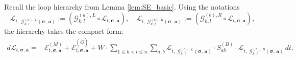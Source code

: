 \documentclass[10pt,reqno]{article}
\theoremstyle{plain} %
\theoremstyle{remark}
\numberwithin{equation}{section}
\begin{document}
 Recall the loop hierarchy from Lemma \ref{lem:SE_basic}. Using the notations
$$
\mathcal{L}_{t,\;  \mathcal{G}^{(a), \,L}_{k, \,l}\left(\boldsymbol{\sigma},\, \textbf{a}\right)} := \left( \mathcal{G}^{(a), L}_{k, l} \circ \mathcal{L}_{t, \boldsymbol{\sigma}, \textbf{a}} \right), \quad  
\mathcal{L}_{t,\;  \mathcal{G}^{(b), \,R}_{k, \,l}\left(\boldsymbol{\sigma},\, \textbf{a}\right)} := \left( \mathcal{G}^{(b), R}_{k, l} \circ \mathcal{L}_{t, \boldsymbol{\sigma}, \textbf{a}} \right),
$$
the hierarchy takes the compact form:
\begin{align}
    d\mathcal{L}_{t, \boldsymbol{\sigma}, \textbf{a}} =& 
    \mathcal{E}^{(M)}_{t, \boldsymbol{\sigma}, \textbf{a}} +
    \mathcal{E}^{(\widetilde{G})}_{t, \boldsymbol{\sigma}, \textbf{a}} +
    W\cdot\sum_{1 \leq k < l \leq n} \sum_{a, b} \mathcal{L}_{t,\;  \mathcal{G}^{(a), \,L}_{k, \,l}\left(\boldsymbol{\sigma},\, \textbf{a}\right)} \cdot  S^{(B)}_{ab} \cdot \mathcal{L}_{t,\;  \mathcal{G}^{(b), \,R}_{k, \,l}\left(\boldsymbol{\sigma},\, \textbf{a}\right)}  \, dt.
\end{align}
\end{document}
